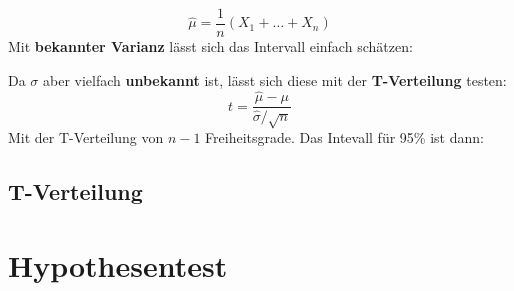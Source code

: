 \documentclass[../Main.tex]{subfiles}
\begin{document}
\begin{equation}
    \hat{\mu} = \frac{1}{n}(X_1+\dots+X_n)
\end{equation} 
Mit \textbf{bekannter Varianz} lässt sich das Intervall einfach schätzen:
\begin{equation}
    [\hat{\mu}-1.96\frac{\sigma}{\sqrt{n}},\hat{\mu}+1.96\frac{\sigma}{\sqrt{n}}]
\end{equation}

Da \(\sigma\) aber vielfach \textbf{unbekannt} ist, lässt sich diese mit der \textbf{T-Verteilung} testen:
\begin{equation}
    t = \frac{\hat{\mu}-\mu}{\hat{\sigma}/\sqrt{n}}
\end{equation} 
Mit der T-Verteilung von \(n-1\) Freiheitsgrade. Das Intevall für 95\% ist dann:
\begin{equation}
    [\hat{\mu}+t_{-}\frac{\sigma}{\sqrt{n}},\hat{\mu}+t_{+}\frac{\sigma}{\sqrt{n}}]
\end{equation}


\subsection{T-Verteilung}

\section{Hypothesentest}
\end{document}
